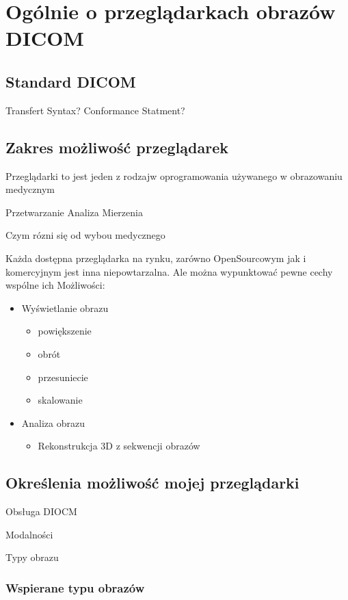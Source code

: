 \section{Ogólnie o przeglądarkach obrazów DICOM}

\subsection{Standard DICOM}

Transfert Syntax?
Conformance Statment?

\subsection{Zakres możliwość przeglądarek}

Przeglądarki to jest jeden z rodzajw oprogramowania używanego w obrazowaniu medycznym

Przetwarzanie
Analiza
Mierzenia

Czym rózni się od wybou medycznego

Każda dostępna przeglądarka na rynku, zarówno OpenSourcowym jak i komercyjnym jest inna niepowtarzalna.
Ale można wypunktować pewne cechy wspólne ich Możliwości:

\begin{itemize}
    \item Wyświetlanie obrazu
    \begin{itemize}
        \item powiększenie
        \item obrót
        \item przesuniecie
        \item skalowanie
    \end{itemize}
    \item Analiza obrazu
    \begin{itemize}
        \item Rekonstrukcja 3D z sekwencji obrazów
    \end{itemize}
\end{itemize}


\subsection{Określenia możliwość mojej przeglądarki}

Obsługa DIOCM

Modalności

Typy obrazu


\subsubsection{Wspierane typu obrazów}

